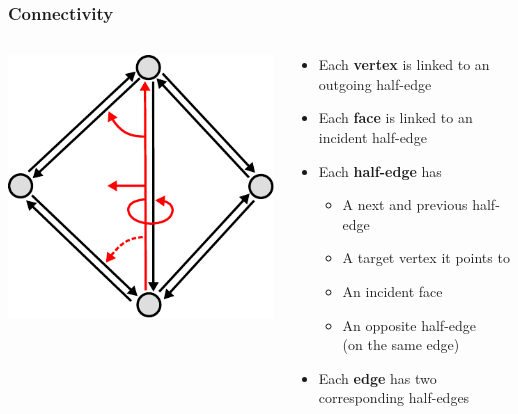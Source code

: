 \begin{frame}
\frametitle{Connectivity}
\begin{columns}[c]
  \begin{column}{0.4\textwidth}
\includegraphics[width=\textwidth]{figures/halfedge-connectivity}
  \end{column}
  \begin{column}{0.6\textwidth}
\begin{itemize}
	\color{black}
	\item[\color{black}\textbullet] Each \textbf{vertex} is linked to an outgoing half-edge
	\item[\color{black}\textbullet] Each \textbf{face} is linked to an incident half-edge
	\item[\color{black}\textbullet] Each \textbf{half-edge} has \begin{itemize}
		\color{black}
		\item[\color{black}\textbullet] A next and previous half-edge
		\item[\color{black}\textbullet] A target vertex it points to
		\item[\color{black}\textbullet] An incident face
		\item[\color{black}\textbullet] An opposite half-edge\\(on the same edge)
	\end{itemize}
	\item[\color{black}\textbullet] Each \textbf{edge} has two corresponding half-edges
\end{itemize}
  \end{column}
\end{columns}
\end{frame}

